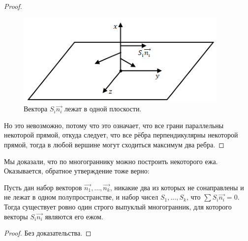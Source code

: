\begin{proof}
    \begin{figure}[ht]
        \centering
        \includegraphics[scale=0.8]{images/c7.7.png}
        \caption{Вектора $S_i \overrightarrow{n_i}$ лежат в одной плоскости.}
        \label{fig:c7.7}
    \end{figure}

    Но это невозможно, потому что это означает, что все грани параллельны некоторой прямой, откуда следует, что все рёбра перпендикулярны некоторой прямой, тогда в любой вершине могут сходиться максимум два ребра.
\end{proof} 

Мы доказали, что по многограннику можно построить некоторого ежа. Оказывается, обратное утверждение тоже верно:

\begin{theorem}[Минковский]
    Пусть дан набор векторов $\overrightarrow{n_1}, \dots, \overrightarrow{n_k}$, никакие два из которых не сонаправлены и не лежат в одном полупространстве, и набор чисел $S_1, \dots, S_k$, что $\sum S_i \overrightarrow{n_i} = 0$. Тогда существует ровно один строго выпуклый многогранник, для которого векторы $S_i \overrightarrow{n_i}$ являются его ежом.
\end{theorem}
\begin{proof}
    Без доказательства.
\end{proof}